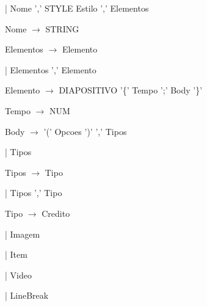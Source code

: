 \documentclass[11pt,a4paper]{report}
\begin{document}
\vspace{0.2cm}
\hspace{3.15cm} | Nome ',' STYLE Estilo ',' Elementos 

\vspace{0.2cm}
\hspace{1.0cm} Nome $\rightarrow$ STRING

\vspace{0.2cm}
\hspace{1.0cm} Elementos $\rightarrow$ Elemento

\vspace{0.2cm}
\hspace{3.05cm} | Elementos ',' Elemento

\vspace{0.2cm}
\hspace{1.0cm} Elemento $\rightarrow$ DIAPOSITIVO '\{' Tempo ';' Body '\}' 

\vspace{0.2cm}
\hspace{1.0cm} Tempo $\rightarrow$ NUM

\vspace{0.2cm}
\hspace{1.0cm} Body $\rightarrow$ '(' Opcoes ')' ',' Tipos

\vspace{0.2cm}
\hspace{2.3cm} | Tipos

\vspace{0.2cm}
\hspace{1.0cm} Tipos $\rightarrow$ Tipo

\vspace{0.2cm}
\hspace{2.3cm} | Tipos ',' Tipo

\vspace{0.2cm}
\hspace{1.0cm} Tipo $\rightarrow$ Credito

\vspace{0.2cm}
\hspace{2.2cm} | Imagem

\vspace{0.2cm}
\hspace{2.2cm} | Item

\vspace{0.2cm}
\hspace{2.2cm} | Video

\vspace{0.2cm}
\hspace{2.2cm} | LineBreak
\end{document}
